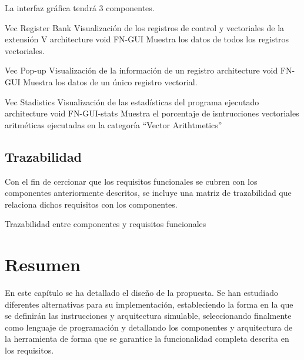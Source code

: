 La interfaz gráfica tendrá 3 componentes.

\begin{component}{Vec Register Bank} %
{Visualización de los registros de control y vectoriales de la extensión V}
{\NA}
{architecture}
{void}
{FN-GUI}
Muestra los datos de todos los registros vectoriales.
\end{component}

\begin{component}{Vec Pop-up} %
{Visualización de la información de un registro}
{\NA}
{architecture}
{void}
{FN-GUI}
Muestra los datos de un único registro vectorial.
\end{component}

\begin{component}{Vec Stadistics} %
{Visualización de las estadísticas del programa ejecutado}
{\NA}
{architecture}
{void}
{FN-GUI-stats}
Muestra el porcentaje de isntrucciones vectoriales aritméticas ejecutadas en la categoría ``Vector Arithtmetics''
\end{component}

\FloatBarrier

\subsection{Trazabilidad}

Con el fin de cercionar que los requisitos funcionales se cubren con los componentes anteriormente descritos, se incluye una matriz de trazabilidad que relaciona dichos requisitos con los componentes.

\begin{table}[H]
    {\traceabilityCompFN}
    \caption{Trazabilidad entre componentes y requisitos funcionales}\label{traz-3:compFN}
\end{table}

\section{Resumen}
En este capítulo se ha detallado el diseño de la propuesta. Se han estudiado diferentes alternativas para su implementación,  estableciendo la forma en la que se definirán las instrucciones y arquitectura simulable, seleccionando finalmente {\js} como lenguaje de programación y detallando los componentes y arquitectura de la herramienta de forma que se garantice la funcionalidad completa descrita en los requisitos. 
